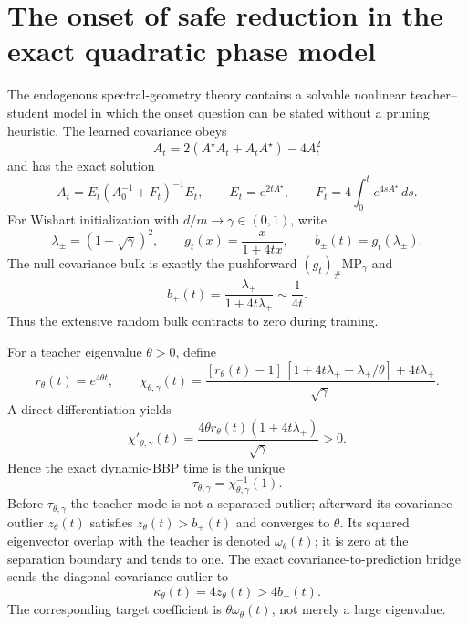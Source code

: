 \section{The onset of safe reduction in the exact quadratic phase model}
The endogenous spectral-geometry theory contains a solvable nonlinear teacher--student model in which the onset question can be stated without a pruning heuristic. The learned covariance obeys
\[
\dot A_t=2(A^\star A_t+A_tA^\star)-4A_t^2
\]
and has the exact solution
\[
A_t=E_t(A_0^{-1}+F_t)^{-1}E_t,
\qquad
E_t=e^{2tA^\star},
\qquad
F_t=4\int_0^t e^{4sA^\star}\,ds.
\]
For Wishart initialization with $d/m\to\gamma\in(0,1)$, write
\[
\lambda_\pm=(1\pm\sqrt\gamma)^2,
\qquad
g_t(x)=\frac{x}{1+4tx},
\qquad
b_\pm(t)=g_t(\lambda_\pm).
\]
The null covariance bulk is exactly the pushforward $(g_t)_\#\mathrm{MP}_\gamma$ and
\[
\boxed{b_+(t)=\frac{\lambda_+}{1+4t\lambda_+}\sim\frac1{4t}.}
\]
Thus the extensive random bulk contracts to zero during training.

For a teacher eigenvalue $\theta>0$, define
\[
r_\theta(t)=e^{4\theta t},
\qquad
\chi_{\theta,\gamma}(t)
=
\frac{
[r_\theta(t)-1]\,[1+4t\lambda_+-\lambda_+/\theta]+4t\lambda_+
}{\sqrt\gamma}.
\]
A direct differentiation yields
\[
\chi'_{\theta,\gamma}(t)
=
\frac{4\theta r_\theta(t)(1+4t\lambda_+)}{\sqrt\gamma}>0.
\]
Hence the exact dynamic-BBP time is the unique
\[
\boxed{\tau_{\theta,\gamma}=\chi_{\theta,\gamma}^{-1}(1).}
\]
Before $\tau_{\theta,\gamma}$ the teacher mode is not a separated outlier; afterward its covariance outlier $z_\theta(t)$ satisfies $z_\theta(t)>b_+(t)$ and converges to $\theta$. Its squared eigenvector overlap with the teacher is denoted $\omega_\theta(t)$; it is zero at the separation boundary and tends to one. The exact covariance-to-prediction bridge sends the diagonal covariance outlier to
\[
\kappa_\theta(t)=4z_\theta(t)>4b_+(t).
\]
The corresponding target coefficient is $\theta\omega_\theta(t)$, not merely a large eigenvalue.

